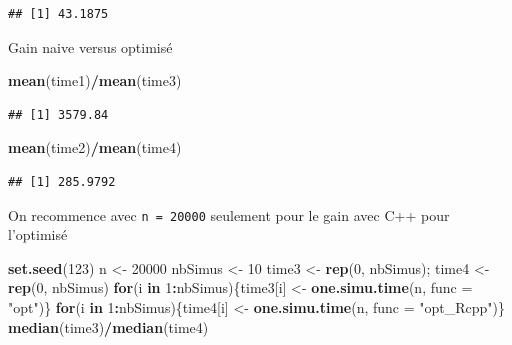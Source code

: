 \documentclass[
]{article}
\newenvironment{Shaded}{\begin{snugshade}}{\end{snugshade}}
\newcommand{\AttributeTok}[1]{\textcolor[rgb]{0.13,0.29,0.53}{#1}}
\newcommand{\ControlFlowTok}[1]{\textcolor[rgb]{0.13,0.29,0.53}{\textbf{#1}}}
\newcommand{\DecValTok}[1]{\textcolor[rgb]{0.00,0.00,0.81}{#1}}
\newcommand{\FunctionTok}[1]{\textcolor[rgb]{0.13,0.29,0.53}{\textbf{#1}}}
\newcommand{\NormalTok}[1]{#1}
\newcommand{\OtherTok}[1]{\textcolor[rgb]{0.56,0.35,0.01}{#1}}
\newcommand{\SpecialCharTok}[1]{\textcolor[rgb]{0.81,0.36,0.00}{\textbf{#1}}}
\newcommand{\StringTok}[1]{\textcolor[rgb]{0.31,0.60,0.02}{#1}}
\begin{document}
\begin{verbatim}
## [1] 43.1875
\end{verbatim}

Gain naive versus optimisé

\begin{Shaded}
\begin{Highlighting}[]
\FunctionTok{mean}\NormalTok{(time1)}\SpecialCharTok{/}\FunctionTok{mean}\NormalTok{(time3)}
\end{Highlighting}
\end{Shaded}

\begin{verbatim}
## [1] 3579.84
\end{verbatim}

\begin{Shaded}
\begin{Highlighting}[]
\FunctionTok{mean}\NormalTok{(time2)}\SpecialCharTok{/}\FunctionTok{mean}\NormalTok{(time4)}
\end{Highlighting}
\end{Shaded}

\begin{verbatim}
## [1] 285.9792
\end{verbatim}

On recommence avec \texttt{n\ =\ 20000} seulement pour le gain avec C++
pour l'optimisé

\begin{Shaded}
\begin{Highlighting}[]
\FunctionTok{set.seed}\NormalTok{(}\DecValTok{123}\NormalTok{)}
\NormalTok{n }\OtherTok{\textless{}{-}} \DecValTok{20000}
\NormalTok{nbSimus }\OtherTok{\textless{}{-}} \DecValTok{10}
\NormalTok{time3 }\OtherTok{\textless{}{-}} \FunctionTok{rep}\NormalTok{(}\DecValTok{0}\NormalTok{, nbSimus); time4 }\OtherTok{\textless{}{-}} \FunctionTok{rep}\NormalTok{(}\DecValTok{0}\NormalTok{, nbSimus)}
\ControlFlowTok{for}\NormalTok{(i }\ControlFlowTok{in} \DecValTok{1}\SpecialCharTok{:}\NormalTok{nbSimus)\{time3[i] }\OtherTok{\textless{}{-}} \FunctionTok{one.simu.time}\NormalTok{(n, }\AttributeTok{func =} \StringTok{"opt"}\NormalTok{)\}}
\ControlFlowTok{for}\NormalTok{(i }\ControlFlowTok{in} \DecValTok{1}\SpecialCharTok{:}\NormalTok{nbSimus)\{time4[i] }\OtherTok{\textless{}{-}} \FunctionTok{one.simu.time}\NormalTok{(n, }\AttributeTok{func =} \StringTok{"opt\_Rcpp"}\NormalTok{)\}}
\FunctionTok{median}\NormalTok{(time3)}\SpecialCharTok{/}\FunctionTok{median}\NormalTok{(time4)}
\end{Highlighting}
\end{Shaded}
\end{document}
